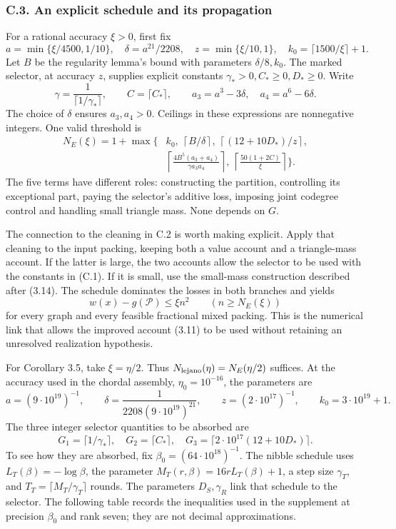 \documentclass[english,11pt,a4paper]{article}
\begin{document}
\subsubsection{C.3. An explicit schedule and its propagation}\label{c.3.-an-explicit-schedule-and-its-propagation}

For a rational accuracy \(\xi>0\), first fix \[
a=\min\{\xi/4500,1/10\},\quad
\delta=a^{21}/2208,\quad z=\min\{\xi/10,1\},\quad
k_0=\lceil1500/\xi\rceil+1.
\] Let \(B\) be the regularity lemma's bound with parameters \(\delta/8,k_0\). The marked selector, at accuracy \(z\), supplies explicit constants \(\gamma_*>0,C_*\ge0,D_*\ge0\). Write \[
\gamma=\frac1{\lceil1/\gamma_*\rceil},\qquad C=\lceil C_*\rceil,\qquad
a_3=a^3-3\delta,\quad a_4=a^6-6\delta.
\] The choice of \(\delta\) ensures \(a_3,a_4>0\). Ceilings in these expressions are nonnegative integers. One valid threshold is \[
\begin{split}
N_E(\xi)=1+\max\biggl\{&
k_0,\ \left\lceil B/\delta\right\rceil,\
\left\lceil(12+10D_*)/z\right\rceil,\\
&\left\lceil\frac{4B^5(a_3+a_4)}{\gamma a_3a_4}\right\rceil,\
\left\lceil\frac{50(1+2C)}{\xi}\right\rceil
\biggr\}.
\end{split}
\tag{C.1}
\] The five terms have different roles: constructing the partition, controlling its exceptional part, paying the selector's additive loss, imposing joint codegree control and handling small triangle mass. None depends on \(G\).

The connection to the cleaning in C.2 is worth making explicit. Apply that cleaning to the input packing, keeping both a value account and a triangle-mass account. If the latter is large, the two accounts allow the selector to be used with the constants in (C.1). If it is small, use the small-mass construction described after (3.14). The schedule dominates the losses in both branches and yields \[
w(x)-g(\mathcal P)\le\xi n^2
\qquad(n\ge N_E(\xi))
\tag{C.2}
\] for every graph and every feasible fractional mixed packing. This is the numerical link that allows the improved account (3.11) to be used without retaining an unresolved realization hypothesis.

For Corollary 3.5, take \(\xi=\eta/2\). Thus \(N_{\rm lejano}(\eta)=N_E(\eta/2)\) suffices. At the accuracy used in the chordal assembly, \(\eta_0=10^{-16}\), the parameters are \[
a=(9\cdot10^{19})^{-1},\qquad
\delta=\frac1{2208(9\cdot10^{19})^{21}},\qquad
z=(2\cdot10^{17})^{-1},\qquad k_0=3\cdot10^{19}+1.
\] The three integer selector quantities to be absorbed are \[
G_1=\lceil1/\gamma_*\rceil,\quad G_2=\lceil C_*\rceil,\quad
G_3=\lceil2\cdot10^{17}(12+10D_*)\rceil.
\] To see how they are absorbed, fix \(\beta_0=(64\cdot10^{18})^{-1}\). The nibble schedule uses \(L_T(\beta)=-\log\beta\), the parameter \(M_T(r,\beta)=16rL_T(\beta)+1\), a step size \(\gamma_T\), and \(T_T=\lceil M_T/\gamma_T\rceil\) rounds. The parameters \(D_S,\gamma_R\) link that schedule to the selector. The following table records the inequalities used in the supplement at precision \(\beta_0\) and rank seven; they are not decimal approximations.
\end{document}
